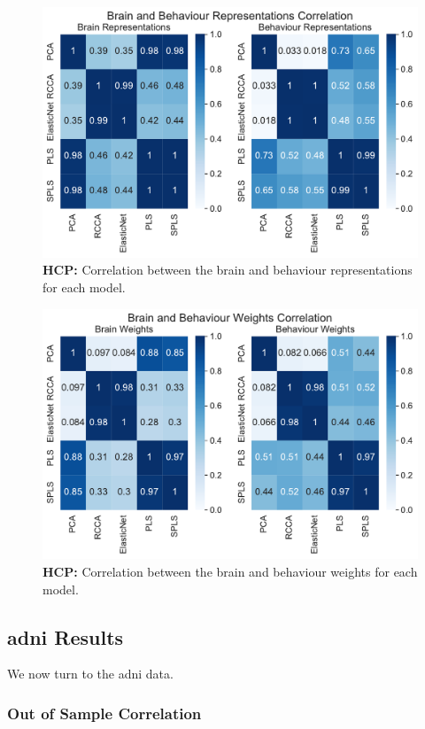 \begin{figure}
    \centering
    \includegraphics[width=0.8\linewidth]{figures/hcp/brain and behaviour scores correlation}
    \caption{\textbf{HCP:} Correlation between the brain and behaviour \gls{representations} for each model.}\label{fig:brain-behaviour-scores-sim}
\end{figure}

\begin{figure}
    \centering
    \includegraphics[width=0.8\linewidth]{figures/hcp/brain and behaviour weights correlation}
    \caption{\textbf{HCP:} Correlation between the brain and behaviour \gls{weights} for each model.}\label{fig:brain-behaviour-weights-sim}
\end{figure}


\subsection{\acrshort{adni} Results}\label{subsec:adni}

We now turn to the \acrshort{adni} data.

\subsubsection{Out of Sample Correlation}

